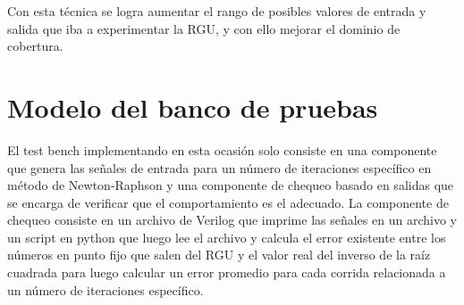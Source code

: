 Con esta técnica se logra aumentar el rango de posibles valores de entrada y salida que iba a experimentar la RGU, y con ello mejorar el dominio de cobertura.

\section{Modelo del banco de pruebas}

El test bench implementando en esta ocasión solo consiste en una componente que genera las señales de entrada
para un número de iteraciones específico en método de Newton-Raphson y una componente de chequeo basado en salidas que se encarga de verificar que el comportamiento es el adecuado.
La componente de chequeo consiste en un archivo de Verilog que imprime las señales en un archivo y un script en python que luego lee el archivo y calcula el error existente entre los números en punto fijo que salen del RGU y el valor real del inverso de la raíz cuadrada para luego calcular un error promedio para cada corrida relacionada a un número de iteraciones específico.

